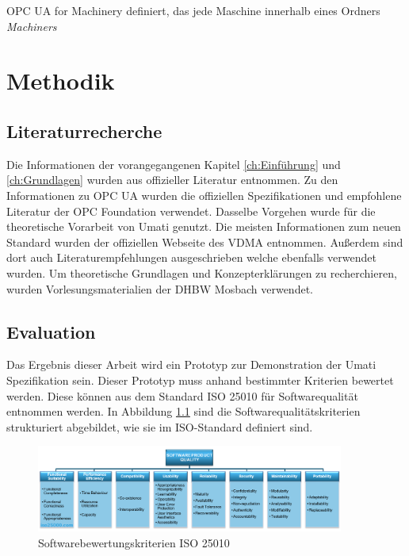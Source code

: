 \documentclass[a4paper, 12pt, oneside]{scrbook}
\begin{document}
		OPC UA for Machinery definiert, das jede Maschine innerhalb eines Ordners \textit{Machiners} 

\chapter{Methodik}\label{ch:Methodiken}
	
	
	\section{Literaturrecherche}
	
	Die Informationen der vorangegangenen Kapitel \ref{ch:Einführung} und \ref{ch:Grundlagen} wurden aus offizieller Literatur entnommen. Zu den Informationen zu OPC UA wurden die offiziellen Spezifikationen und empfohlene Literatur der OPC Foundation verwendet. Dasselbe Vorgehen wurde für die theoretische Vorarbeit von Umati genutzt. Die meisten Informationen zum neuen Standard wurden der offiziellen Webseite des VDMA entnommen. Außerdem sind dort auch Literaturempfehlungen ausgeschrieben welche ebenfalls verwendet wurden. Um theoretische Grundlagen und Konzepterklärungen zu recherchieren, wurden Vorlesungsmaterialien der DHBW Mosbach verwendet.
	
	
	
	\section{Evaluation}
	
	
	Das Ergebnis dieser Arbeit wird ein Prototyp zur Demonstration der Umati Spezifikation sein. Dieser Prototyp muss anhand bestimmter Kriterien bewertet werden. Diese können aus dem Standard ISO 25010 für Softwarequalität entnommen werden. In Abbildung \ref{fig:ISO25010} sind die Softwarequalitätskriterien strukturiert abgebildet, wie sie im ISO-Standard definiert sind. 
	
	\begin{figure}[H]
		\centering
		\includegraphics[width=0.9\textwidth]{res/diagramms/iso25010.png}
		\caption{Softwarebewertungskriterien ISO 25010} 
		\label{fig:ISO25010}
	\end{figure}
	
\end{document}
